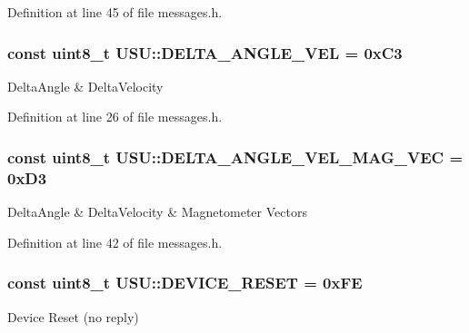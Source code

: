 \-Definition at line 45 of file messages.\-h.

\hypertarget{namespace_u_s_u_acaafc8eff5346d9c529238dd0ceb61a6}{
\subsubsection[{\-D\-E\-L\-T\-A\-\_\-\-A\-N\-G\-L\-E\-\_\-\-V\-E\-L}]{\setlength{\rightskip}{0pt plus 5cm}const uint8\-\_\-t {\bf \-U\-S\-U\-::\-D\-E\-L\-T\-A\-\_\-\-A\-N\-G\-L\-E\-\_\-\-V\-E\-L} = 0x\-C3}}\label{namespace_u_s_u_acaafc8eff5346d9c529238dd0ceb61a6}
\-Delta\-Angle \& \-Delta\-Velocity 

\-Definition at line 26 of file messages.\-h.

\hypertarget{namespace_u_s_u_a18e6e53c69e61c3538c351bb86c77629}{
\subsubsection[{\-D\-E\-L\-T\-A\-\_\-\-A\-N\-G\-L\-E\-\_\-\-V\-E\-L\-\_\-\-M\-A\-G\-\_\-\-V\-E\-C}]{\setlength{\rightskip}{0pt plus 5cm}const uint8\-\_\-t {\bf \-U\-S\-U\-::\-D\-E\-L\-T\-A\-\_\-\-A\-N\-G\-L\-E\-\_\-\-V\-E\-L\-\_\-\-M\-A\-G\-\_\-\-V\-E\-C} = 0x\-D3}}\label{namespace_u_s_u_a18e6e53c69e61c3538c351bb86c77629}
\-Delta\-Angle \& \-Delta\-Velocity \& \-Magnetometer \-Vectors 

\-Definition at line 42 of file messages.\-h.

\hypertarget{namespace_u_s_u_a7c9f78c9bb18ba92a529bf5819f6a5d2}{
\subsubsection[{\-D\-E\-V\-I\-C\-E\-\_\-\-R\-E\-S\-E\-T}]{\setlength{\rightskip}{0pt plus 5cm}const uint8\-\_\-t {\bf \-U\-S\-U\-::\-D\-E\-V\-I\-C\-E\-\_\-\-R\-E\-S\-E\-T} = 0x\-F\-E}}\label{namespace_u_s_u_a7c9f78c9bb18ba92a529bf5819f6a5d2}
\-Device \-Reset (no reply) 


